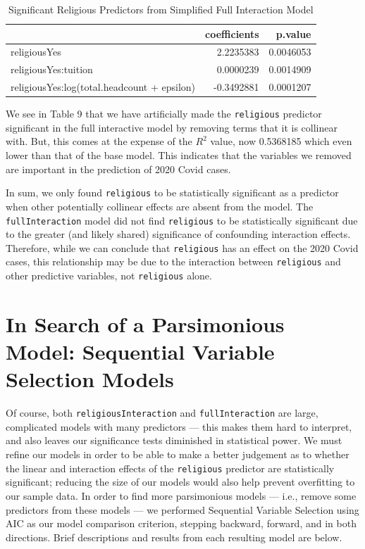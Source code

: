 \documentclass[
]{article}
\begin{document}
\begin{table}

\caption{\label{tab:unnamed-chunk-23}Significant Religious Predictors from Simplified Full Interaction Model}
\centering
\begin{tabular}[t]{l|r|r}
\hline
  & coefficients & p.value\\
\hline
religiousYes & 2.2235383 & 0.0046053\\
\hline
religiousYes:tuition & 0.0000239 & 0.0014909\\
\hline
religiousYes:log(total.headcount + epsilon) & -0.3492881 & 0.0001207\\
\hline
\end{tabular}
\end{table}

We see in Table 9 that we have artificially made the \texttt{religious}
predictor significant in the full interactive model by removing terms
that it is collinear with. But, this comes at the expense of the \(R^2\)
value, now 0.5368185 which even lower than that of the base model. This
indicates that the variables we removed are important in the prediction
of 2020 Covid cases.

In sum, we only found \texttt{religious} to be statistically significant
as a predictor when other potentially collinear effects are absent from
the model. The \texttt{fullInteraction} model did not find
\texttt{religious} to be statistically significant due to the greater
(and likely shared) significance of confounding interaction effects.
Therefore, while we can conclude that \texttt{religious} has an effect
on the 2020 Covid cases, this relationship may be due to the interaction
between \texttt{religious} and other predictive variables, not
\texttt{religious} alone.

\hypertarget{in-search-of-a-parsimonious-model-sequential-variable-selection-models}{%
\section{In Search of a Parsimonious Model: Sequential Variable
Selection
Models}\label{in-search-of-a-parsimonious-model-sequential-variable-selection-models}}

Of course, both \texttt{religiousInteraction} and
\texttt{fullInteraction} are large, complicated models with many
predictors --- this makes them hard to interpret, and also leaves our
significance tests diminished in statistical power. We must refine our
models in order to be able to make a better judgement as to whether the
linear and interaction effects of the \texttt{religious} predictor are
statistically significant; reducing the size of our models would also
help prevent overfitting to our sample data. In order to find more
parsimonious models --- i.e., remove some predictors from these models
--- we performed Sequential Variable Selection using AIC as our model
comparison criterion, stepping backward, forward, and in both
directions. Brief descriptions and results from each resulting model are
below.
\end{document}
